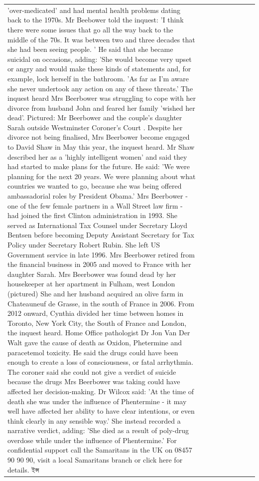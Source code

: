 \begin{table}[H]
\begin{tabular}{lllrlllll}
'over-medicated' and had mental health problems dating back to the 1970s. Mr Beebower told the inquest: 'I think there were some issues that go all the way back to the middle of the 70s. It was between two and three decades that she had been seeing people. ' He said that she became suicidal on occasions, adding: 'She would become very upset or angry and would make these kinds of statements and, for example, lock herself in the bathroom. 'As far as I'm aware she never undertook any action on any of these threats.' The inquest heard Mrs Beerbower was struggling to cope with her divorce from husband John and feared her family 'wished her dead'. Pictured: Mr Beerbower and the couple's daughter Sarah outside Westminster Coroner's Court . Despite her divorce not being finalised, Mrs Beerbower become engaged to David Shaw in May this year, the inquest heard. Mr Shaw described her as a 'highly intelligent women' and said they had started to make plans for the future. He said: 'We were planning for the next 20 years. We were planning about what countries we wanted to go, because she was being offered ambassadorial roles by President Obama.' Mrs Beerbower - one of the few female partners in a Wall Street law firm - had joined the first Clinton administration in 1993. She served as International Tax Counsel under Secretary Lloyd Bentsen before becoming Deputy Assistant Secretary for Tax Policy under Secretary Robert Rubin. She left US Government service in late 1996. Mrs Beerbower retired from the financial business in 2005 and moved to France with her daughter Sarah. Mrs Beerbower was found dead by her housekeeper at her apartment in Fulham, west London (pictured) She and her husband acquired an olive farm in Chateauneuf de Grasse, in the south of France in 2006. From 2012 onward, Cynthia divided her time between homes in Toronto, New York City, the South of France and London, the inquest heard. Home Office pathologist Dr Jon Van Der Walt gave the cause of death as Oxidon, Phetermine and paracetemol toxicity. He said the drugs could have been enough to create a loss of consciousness, or fatal arrhythmia. The coroner said she could not give a verdict of suicide because the drugs Mrs Beerbower was taking could have affected her decision-making. Dr Wilcox said: 'At the time of death she was under the influence of Phentermine - it may well have affected her ability to have clear intentions, or even think clearly in any sensible way.' She instead recorded a narrative verdict, adding: 'She died as a result of poly-drug overdose while under the influence of Phentermine.' For confidential support call the Samaritans in the UK on 08457 90 90 90, visit a local Samaritans branch or click here for details. ইন্স \\

\end{tabular}
\end{table}
